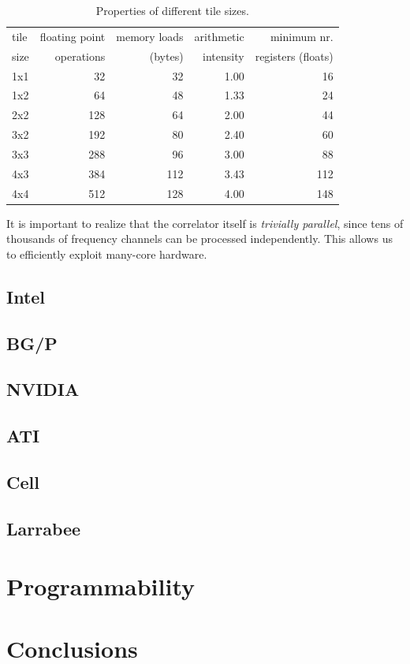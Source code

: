 \documentclass{article}
\begin{document}
\begin{table}
\begin{center}
{\small
\begin{tabular}{l|r|r|r|r}
tile & floating point & memory loads & arithmetic     &  minimum nr.           \\
size & operations     & (bytes)      & intensity      &  registers (floats)    \\
\hline
1x1  &  32            &   32         &   1.00         &  16                    \\
1x2  &  64            &   48         &   1.33         &  24                    \\
2x2  & 128            &   64         &   2.00         &  44                    \\
3x2  & 192            &   80         &   2.40         &  60                    \\
3x3  & 288            &   96         &   3.00         &  88                    \\
4x3  & 384            &  112         &   3.43         & 112                    \\
4x4  & 512            &  128         &   4.00         & 148                    \\
\end{tabular}
} %
\end{center}
\vspace{-0.5cm}
\caption{Properties of different tile sizes.}
\label{tile-size-table}
\end{table}

It is important to realize that the
correlator itself is \emph{trivially parallel}, since tens of thousands of
frequency channels can be processed independently.  This allows us to
efficiently exploit many-core hardware.


\subsection{Intel}
\subsection{BG/P}
\subsection{NVIDIA}
\subsection{ATI}
\subsection{Cell}
\subsection{Larrabee}

 
\section{Programmability}


\section{Conclusions}




\end{document}
